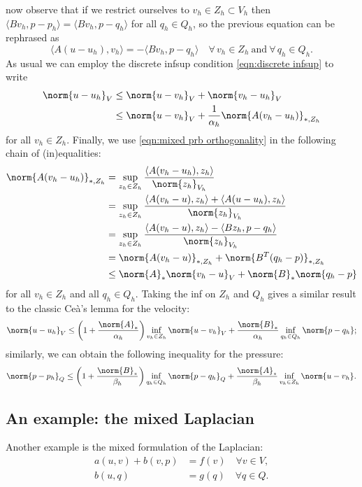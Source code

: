now observe that if we restrict ourselves to $v_h\in Z_h\subset V_h$ then $\langle Bv_h,p-p_h\rangle=\langle Bv_h,p-q_h\rangle$ for all $q_h\in Q_h$, so the previous equation can be rephrased as
\begin{equation}\label{eqn:mixed prb orthogonality}
    \langle A(u-u_h),v_h\rangle=-\langle Bv_h,p-q_h\rangle \quad \forall\, v_h\in Z_h \ \text{and} \ \forall\,q_h\in Q_h.
\end{equation}
As usual we can employ the discrete infsup condition \eqref{eqn:discrete infsup} to write
\begin{align*}
    \norm{u-u_h}_V&\leq\norm{u-v_h}_V+\norm{v_h-u_h}_V\\
    &\leq\norm{u-v_h}_V +\frac{1}{\alpha_h}\norm{A(v_h-u_h)}_{*,Z_h}
\end{align*}
for all $v_h\in Z_h$. Finally, we use \eqref{eqn:mixed prb orthogonality} in the following chain of (in)equalities:
\begin{align*}
    \norm{A(v_h-u_h)}_{*,Z_h} &= \sup_{z_h\in Z_h}\frac{\langle A(v_h-u_h),z_h\rangle}{\norm{z_h}_{V_h}}\\
    &= \sup_{z_h\in Z_h}\frac{\langle A(v_h-u),z_h\rangle + \langle A(u-u_h),z_h\rangle}{\norm{z_h}_{V_h}}\\
    &= \sup_{z_h\in Z_h}\frac{\langle A(v_h-u),z_h\rangle - \langle Bz_h,p-q_h\rangle}{\norm{z_h}_{V_h}}\\
    &= \norm{A(v_h-u)}_{*,Z_h}+\norm{B^T(q_h-p)}_{*,Z_h}\\
    &\leq \norm{A}_*\norm{v_h-u}_V+\norm{B}_*\norm{q_h-p}
\end{align*}
for all $v_h\in Z_h$ and all $q_h\in Q_h$. Taking the inf on $Z_h$ and $Q_h$ gives a similar result to the classic Ceà's lemma for the velocity:
\begin{equation*}
    \norm{u-u_h}_V\leq \left( 1+\frac{\norm{A}_*}{\alpha_h}\right)\inf_{v_h\in Z_h}\norm{u-v_h}_V+\frac{\norm{B}_*}{\alpha_h}\inf_{q_h\in Q_h}\norm{p-q_h};
\end{equation*}
similarly, we can obtain the following inequality for the pressure:
\begin{equation*}
    \norm{p-p_h}_Q\leq \left( 1+\frac{\norm{B}_*}{\beta_h}\right)\inf_{q_h\in Q_h}\norm{p-q_h}_Q+\frac{\norm{A}_*}{\beta_h}\inf_{v_h\in Z_h}\norm{u-v_h}.
\end{equation*}



\subsection{An example: the mixed Laplacian}
Another example is the mixed formulation of the Laplacian:
\begin{equation}
    \begin{aligned}
        a(u, v) + b(v, p) &= f(v) \quad \forall v \in V, \\
        b(u, q) &= g(q) \quad \forall q \in Q.
    \end{aligned}
\end{equation}

